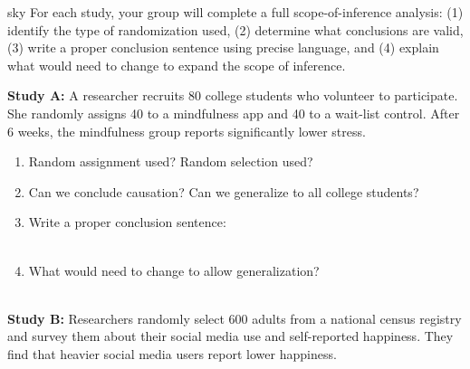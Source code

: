 \documentclass[10pt]{article}
\begin{document}
\namepartnerperiod

\vspace{0.1in}

\begin{scenariobox}[Context]{sky}
\small
For each study, your group will complete a full scope-of-inference analysis:
(1) identify the type of randomization used, (2) determine what conclusions are
valid, (3) write a proper conclusion sentence using precise language, and
(4) explain what would need to change to expand the scope of inference.
\end{scenariobox}

\vspace{0.1in}

\textbf{Study A:} A researcher recruits 80 college students who volunteer to
participate. She randomly assigns 40 to a mindfulness app and 40 to a wait-list
control. After 6 weeks, the mindfulness group reports significantly lower stress.

\begin{practicebox}
\small
\begin{enumerate}[leftmargin=1.5em, itemsep=7pt]
  \item Random assignment used?  \quad Random selection used? 
  \item Can we conclude causation?  \quad Can we generalize to all college
        students? 
  \item Write a proper conclusion sentence:\\
        \\[1pt]
  \item What would need to change to allow generalization?\\
        \\[1pt]
\end{enumerate}
\end{practicebox}

\vspace{0.1in}

\textbf{Study B:} Researchers randomly select 600 adults from a national census
registry and survey them about their social media use and self-reported happiness.
They find that heavier social media users report lower happiness.
\end{document}
